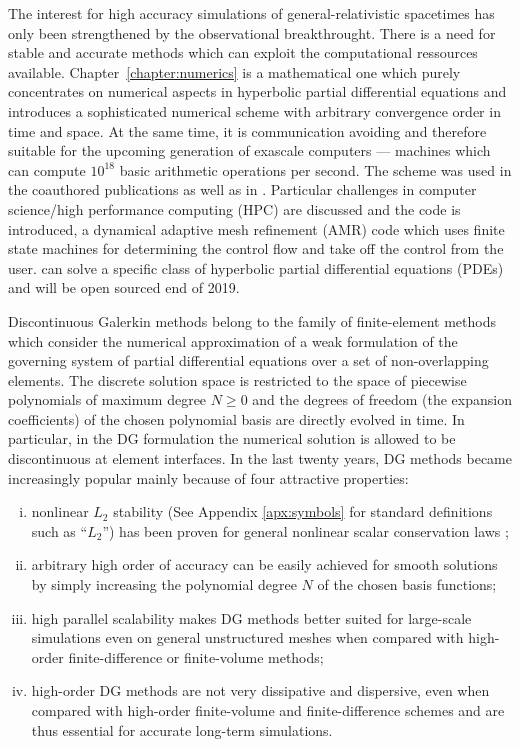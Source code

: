 \begin{fullwidth}
The interest for high accuracy simulations of general-relativistic
spacetimes has only been strengthened by the observational
breakthrought. There is a need for stable and accurate methods
which can exploit the computational ressources available.
Chapter~\vref{chapter:numerics} is a mathematical one which purely
concentrates on numerical aspects in hyperbolic partial differential
equations and introduces a sophisticated numerical scheme with
arbitrary convergence order in time and space. At the same time,
it is communication avoiding and therefore suitable for the upcoming
generation of exascale computers --- machines which can compute
$10^{18}$ basic arithmetic operations per second. The scheme was
used in the coauthored publications \cite{Dumbser2017,Fambri2018} as
well as in \cite{exahype-review,exahype-guidebook}. Particular
challenges in computer science/high performance computing (HPC) are
discussed and the  code is introduced, a dynamical
adaptive mesh refinement (AMR) code
which uses finite state machines for determining the control flow
and take off the control from the user.  can solve a
specific class of hyperbolic partial differential equations (PDEs)
and will be open sourced end of 2019.

Discontinuous Galerkin methods belong to the family of finite-element
methods which consider the numerical approximation of a weak formulation
of the governing system of partial differential equations over a set of
non-overlapping elements. The discrete solution space is restricted to
the space of piecewise polynomials of maximum degree $N \geq 0$ and the
degrees of freedom (\ie the expansion coefficients) of the chosen
polynomial basis are directly evolved in time.
In particular, in the DG formulation the
numerical solution is allowed to be {discontinuous} at element interfaces.
%
In the last twenty years, DG methods became increasingly popular mainly
because of four attractive properties:
\begin{enumerate}[(i)]
  \item nonlinear $L_2$ stability (See 
    Appendix \ref{apx:symbols} for standard definitions such as ``$L_2$'')
    has been proven for general nonlinear scalar conservation laws
    \cite{Jiang1994};
  \item arbitrary high order of accuracy can be easily
    achieved for smooth solutions by simply increasing the polynomial degree
    $N$ of the chosen basis functions;
  \item high parallel scalability makes DG methods better suited for
    large-scale simulations even on general
    unstructured meshes when compared with high-order finite-difference or
    finite-volume methods;
  \item high-order DG methods are not very dissipative and dispersive, even
    when compared with high-order finite-volume and finite-difference schemes
    and are thus essential for accurate long-term simulations. 
\end{enumerate}
    

\end{fullwidth}

